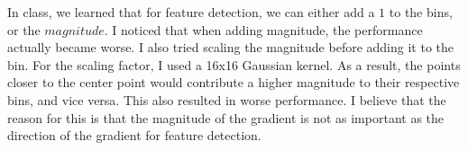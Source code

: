 \documentclass{article}
\begin{document}
In class, we learned that for feature detection, we can either add a $1$ to the bins, or the $magnitude$. I noticed that when adding magnitude, the performance actually became worse. I also tried scaling the magnitude before adding it to the bin. For the scaling factor, I used a 16x16 Gaussian kernel. As a result, the points closer to the center point would contribute a higher magnitude to their respective bins, and vice versa. This also resulted in worse performance. I believe that the reason for this is that the magnitude of the gradient is not as important as the direction of the gradient for feature detection.
\end{document}
